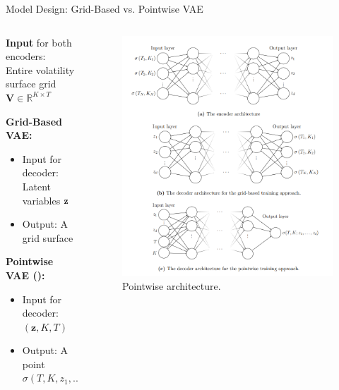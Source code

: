 \documentclass{beamer}
\begin{document}


\begin{frame}{Model Design: Grid-Based vs. Pointwise VAE}
\begin{columns}
    \begin{column}{0.6\textwidth}
\textbf{Input} for both encoders: \\ Entire volatility surface grid \(\mathbf{V} \in \mathbb{R}^{K \times T}\)
\vspace{0.3cm}

\textbf{Grid-Based VAE:}
\begin{itemize}
    \item Input for decoder: Latent variables $\bf{z}$
    \item Output: A grid surface
\end{itemize}
\textbf{Pointwise VAE (\citet{vaeorigin}):}
\begin{itemize}
    \item Input for decoder: $ (\mathbf{z}, K, T) $
    \item Output: A point $\sigma(T,K,z_1,...z_d)$
\end{itemize}
  \end{column}
  \begin{column}{0.4\textwidth}
    \begin{figure}
\includegraphics[width=\textwidth]{docs/slides/img/vae_vol.png}
\caption{Pointwise architecture.}
\end{figure}
  \end{column}
\end{columns}
\end{frame}
\end{document}
